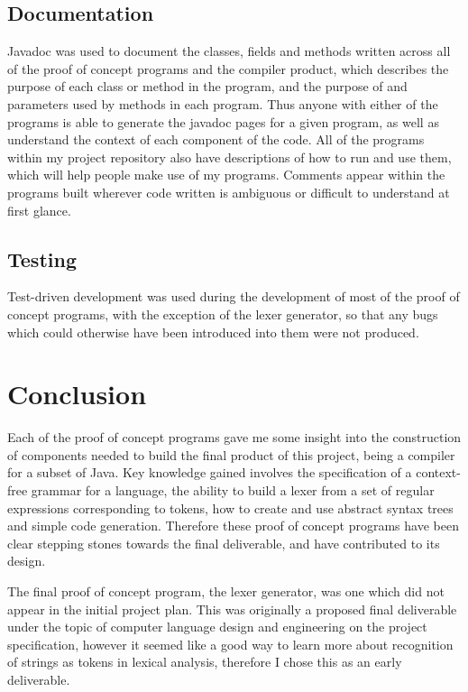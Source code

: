 \documentclass[a4paper, 11pt]{article}
\begin{document}
\subsection{Documentation}
Javadoc was used to document the classes, fields and methods written across all of the proof of concept programs and the compiler product, which describes the purpose of each class or method in the program, and the purpose of and parameters used by methods in each program. Thus anyone with either of the programs is able to generate the javadoc pages for a given program, as well as understand the context of each component of the code. All of the programs within my project repository also have descriptions of how to run and use them, which will help people make use of my programs. Comments appear within the programs built wherever code written is ambiguous or difficult to understand at first glance.

\subsection{Testing}
Test-driven development was used during the development of most of the proof of concept programs, with the exception of the lexer generator, so that any bugs which could otherwise have been introduced into them were not produced.

\newpage\section{Conclusion}
Each of the proof of concept programs gave me some insight into the construction of components needed to build the final product of this project, being a compiler for a subset of Java. Key knowledge gained involves the specification of a context-free grammar for a language, the ability to build a lexer from a set of regular expressions corresponding to tokens, how to create and use abstract syntax trees and simple code generation. Therefore these proof of concept programs have been clear stepping stones towards the final deliverable, and have contributed to its design.

The final proof of concept program, the lexer generator, was one which did not appear in the initial project plan. This was originally a proposed final deliverable under the topic of computer language design and engineering on the project specification, however it seemed like a good way to learn more about recognition of strings as tokens in lexical analysis, therefore I chose this as an early deliverable.
\end{document}
